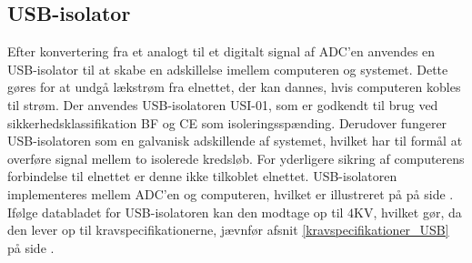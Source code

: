 \subsection{USB-isolator}\label{USB_afsnit}
Efter konvertering fra et analogt til et digitalt signal af ADC'en anvendes en USB-isolator til at skabe en adskillelse imellem computeren og systemet. Dette gøres for at undgå lækstrøm fra elnettet, der kan dannes, hvis computeren kobles til strøm. Der anvendes USB-isolatoren USI-01, som er godkendt til brug ved sikkerhedsklassifikation BF og CE som isoleringsspænding. Derudover fungerer USB-isolatoren som en galvanisk adskillende af systemet, hvilket har til formål at overføre signal mellem to isolerede kredsløb. For yderligere sikring af computerens forbindelse til elnettet er denne ikke tilkoblet elnettet. USB-isolatoren implementeres mellem ADC'en og computeren, hvilket er illustreret på  på side \pageref{kravblok}. \\
Ifølge databladet for USB-isolatoren kan den modtage op til $4$KV, hvilket gør, da den lever op til kravspecifikationerne, jævnfør afsnit \ref{kravspecifikationer_USB} på side \pageref{kravspecifikationer_USB}.
%
